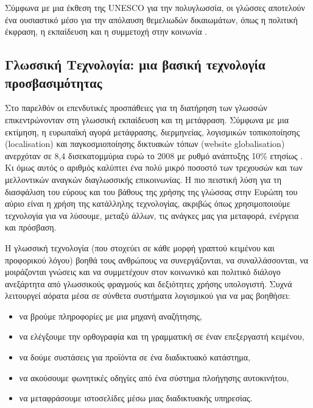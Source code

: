 \begin{multicols}{2}

Σύμφωνα με μια έκθεση της UNESCO για την πολυγλωσσία, οι γλώσσες αποτελούν ένα ουσιαστικό μέσο για την απόλαυση θεμελιωδών δικαιωμάτων, όπως η πολιτική έκφραση, η εκπαίδευση και η συμμετοχή στην κοινωνία \cite{Unesco1}.

\subsection{Γλωσσική Τεχνολογία: μια βασική τεχνολογία προσβασιμότητας}

Στο παρελθόν οι επενδυτικές προσπάθειες για τη διατήρηση των γλωσσών επικεντρώνονταν στη γλωσσική εκπαίδευση και τη μετάφραση. Σύμφωνα με μια εκτίμηση, η ευρωπαϊκή αγορά μετάφρασης, διερμηνείας, λογισμικών τοπικοποίησης (localisation) και παγκοσμιοποίησης δικτυακών τόπων (website globalisation) ανερχόταν σε 8,4 δισεκατομμύρια ευρώ το 2008 με ρυθμό ανάπτυξης 10\% ετησίως \cite{EC3}. Κι όμως αυτός ο αριθμός καλύπτει ένα πολύ μικρό ποσοστό των τρεχουσών και των μελλοντικών αναγκών διαγλωσσικής επικοινωνίας. Η πιο πειστική λύση για τη διασφάλιση του εύρους και του βάθους της χρήσης της γλώσσας στην Ευρώπη του αύριο είναι η χρήση της κατάλληλης τεχνολογίας, ακριβώς όπως χρησιμοποιούμε τεχνολογία για να λύσουμε, μεταξύ άλλων, τις ανάγκες μας για μεταφορά, ενέργεια και πρόσβαση.

Η γλωσσική τεχνολογία (που στοχεύει σε κάθε μορφή γραπτού κειμένου και προφορικού λόγου) βοηθά τους ανθρώπους να συνεργάζονται, να συναλλάσσονται, να μοιράζονται γνώσεις και να συμμετέχουν στον κοινωνικό και πολιτικό διάλογο ανεξάρτητα από γλωσσικούς φραγμούς και δεξιότητες χρήσης υπολογιστή. Συχνά λειτουργεί αόρατα μέσα σε σύνθετα συστήματα λογισμικού για να μας βοηθήσει:

\begin{itemize}
\item να βρούμε πληροφορίες με μια μηχανή αναζήτησης,
\item να ελέγξουμε την ορθογραφία και τη γραμματική σε έναν επεξεργαστή κειμένου,
\item να δούμε συστάσεις για προϊόντα σε ένα διαδικτυακό κατάστημα,
\item να ακούσουμε φωνητικές οδηγίες από ένα σύστημα πλοήγησης αυτοκινήτου,
\item να μεταφράσουμε ιστοσελίδες μέσω μιας διαδικτυακής υπηρεσίας. 
\end{itemize}


\end{multicols}
